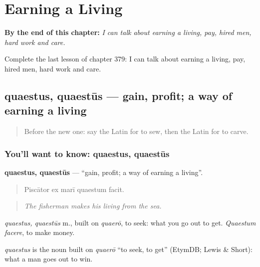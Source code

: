 
\chapter{Earning a Living}
\label{ch:la-earning-a-living}

\begin{chapteropening}
\textbf{By the end of this chapter:} \emph{I can talk about earning a living, pay, hired men, hard work and care.}

Complete the last lesson of chapter 379: I can talk about earning a living, pay, hired men, hard work and care.
\end{chapteropening}

\section[quaestus, quaestūs]{quaestus, quaestūs — gain, profit; a way of earning a living}

\label{lesson:LA-C379-quaestus}



\begin{quote}
Before the new one: say the Latin for to sew, then the Latin for to carve.
\end{quote}

\subsection*{You'll want to know: quaestus, quaestūs}
\textbf{quaestus, quaestūs} — \textquotedblleft{}gain, profit; a way of earning a living\textquotedblright{}.

\begin{quote}
Piscātor ex marī quaestum facit.
\end{quote}

\begin{quote}
\emph{The fisherman makes his living from the sea.}
\end{quote}

\emph{quaestus, quaestūs} m., built on \emph{quaerō}, to seek: what you go out to get. \emph{Quaestum facere}, to make money.

\begin{cousinweb}
\emph{quaestus} is the noun built on \emph{quaerō} \textquotedblleft{}to seek, to get\textquotedblright{} (EtymDB; Lewis \& Short): what a man goes out to win.
\end{cousinweb}


